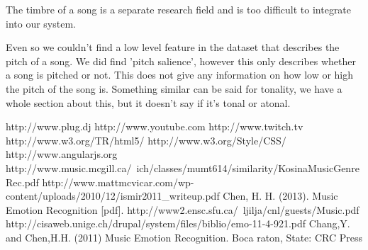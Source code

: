 \documentclass[10pt,a4paper]{article}
\begin{document}
The timbre of a song is a separate research field and is too difficult to integrate into our system.

Even so we couldn't find a low level feature in the dataset that describes the pitch of a song.
We did find 'pitch salience', however this only describes whether a song is pitched or not.
This does not give any information on how low or high the pitch of the song is.
Something similar can be said for tonality, we have a whole section about this, but it doesn't say if it's tonal or atonal.


%
%

\begin{thebibliography}{10}
 http://www.plug.dj
 http://www.youtube.com
 http://www.twitch.tv
 http://www.w3.org/TR/html5/
 http://www.w3.org/Style/CSS/
 http://www.angularjs.org
 http://www.music.mcgill.ca/~ich/classes/mumt614/similarity/KosinaMusicGenreRec.pdf
 http://www.mattmcvicar.com/wp-content/uploads/2010/12/ismir2011\_writeup.pdf
 Chen, H. H. (2013). Music Emotion Recognition [pdf]. http://www2.ensc.sfu.ca/~ljilja/cnl/guests/Music.pdf
 http://cisaweb.unige.ch/drupal/system/files/biblio/emo-11-4-921.pdf
 Chang,Y. and Chen,H.H. (2011) Music Emotion Recognition. Boca raton, State: CRC Press %

\end{thebibliography}
\end{document}
